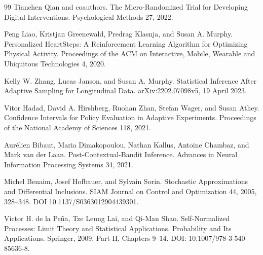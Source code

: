 \documentclass{article}
\begin{document}
\begin{thebibliography}{99}
   Tianchen Qian and coauthors. The Micro-Randomized Trial for Developing Digital Interventions. Psychological Methods 27, 2022.

   Peng Liao, Kristjan Greenewald, Predrag Klasnja, and Susan A. Murphy. Personalized HeartSteps: A Reinforcement Learning Algorithm for Optimizing Physical Activity. Proceedings of the ACM on Interactive, Mobile, Wearable and Ubiquitous Technologies 4, 2020.

   Kelly W. Zhang, Lucas Janson, and Susan A. Murphy. Statistical Inference After Adaptive Sampling for Longitudinal Data. arXiv:2202.07098v5, 19 April 2023.

   Vitor Hadad, David A. Hirshberg, Ruohan Zhan, Stefan Wager, and Susan Athey. Confidence Intervals for Policy Evaluation in Adaptive Experiments. Proceedings of the National Academy of Sciences 118, 2021.

   Aurélien Bibaut, Maria Dimakopoulou, Nathan Kallus, Antoine Chambaz, and Mark van der Laan. Post-Contextual-Bandit Inference. Advances in Neural Information Processing Systems 34, 2021.

   Michel Benaim, Josef Hofbauer, and Sylvain Sorin. Stochastic Approximations and Differential Inclusions. SIAM Journal on Control and Optimization 44, 2005, 328--348. DOI 10.1137/S0363012904439301.

   Victor H. de la Peña, Tze Leung Lai, and Qi-Man Shao. Self-Normalized Processes: Limit Theory and Statistical Applications. Probability and Its Applications. Springer, 2009. Part II, Chapters 9--14. DOI: 10.1007/978-3-540-85636-8.

\end{thebibliography}
\end{document}
